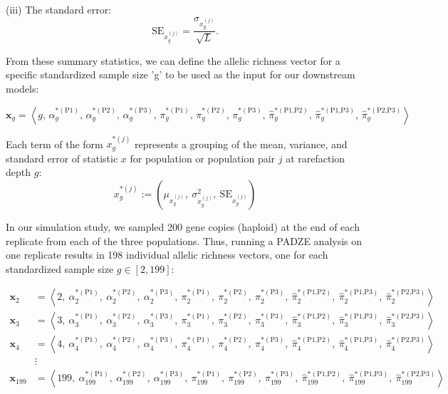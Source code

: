 \documentclass[11pt]{article}
\theoremstyle{plain}
\theoremstyle{definition}
\theoremstyle{remark}
\begin{document}
(iii) The standard error:
    \begin{equation}
    \text{SE}_{x^{(j)}_g} = \frac{\sigma_{x^{(j)}_g}}{\sqrt{L}}.
    \end{equation}


From these summary statistics, we can define the allelic richness vector for a specific standardized sample size 'g' to be used as the input for our downstream models:

\[
\mathbf{x}_g =
\left\langle
g,\,
\alpha^{*(\text{P1})}_g,\,
\alpha^{*(\text{P2})}_g,\,
\alpha^{*(\text{P3})}_g,\,
\pi^{*(\text{P1})}_g,\,
\pi^{*(\text{P2})}_g,\,
\pi^{*(\text{P3})}_g,\,
\hat{\pi}^{*(\text{P1,P2})}_g,\,
\hat{\pi}^{*(\text{P1,P3})}_g,\,
\hat{\pi}^{*(\text{P2,P3})}_g
\right\rangle
\]

\vspace{0.5em}

\noindent Each term of the form \( x^{*(j)}_g \) represents a grouping of the mean, variance, and standard error of statistic \( x \) for population or population pair \( j \) at rarefaction depth \( g \):
\[
x^{*(j)}_g := \left( \mu_{x^{(j)}_g},\ \sigma^2_{x^{(j)}_g},\ \mathrm{SE}_{x^{(j)}_g} \right)
\]

In our simulation study, we sampled 200 gene copies (haploid) at the end of each replicate from each of the three populations. Thus, running a PADZE analysis on one replicate results in 198 individual allelic richness vectors, one for each standardized sample size $g \in [2, 199]$:

\[
\begin{aligned}
\mathbf{x}_2 &= \left\langle 2,\ \alpha^{*(\text{P1})}_2,\ \alpha^{*(\text{P2})}_2,\ \alpha^{*(\text{P3})}_2,\ \pi^{*(\text{P1})}_2,\ \pi^{*(\text{P2})}_2,\ \pi^{*(\text{P3})}_2,\ \hat{\pi}^{*(\text{P1,P2})}_2,\ \hat{\pi}^{*(\text{P1,P3})}_2,\ \hat{\pi}^{*(\text{P2,P3})}_2 \right\rangle \\
\mathbf{x}_3 &= \left\langle 3,\ \alpha^{*(\text{P1})}_3,\ \alpha^{*(\text{P2})}_3,\ \alpha^{*(\text{P3})}_3,\ \pi^{*(\text{P1})}_3,\ \pi^{*(\text{P2})}_3,\ \pi^{*(\text{P3})}_3,\ \hat{\pi}^{*(\text{P1,P2})}_3,\ \hat{\pi}^{*(\text{P1,P3})}_3,\ \hat{\pi}^{*(\text{P2,P3})}_3 \right\rangle \\
\mathbf{x}_4 &= \left\langle 4,\ \alpha^{*(\text{P1})}_4,\ \alpha^{*(\text{P2})}_4,\ \alpha^{*(\text{P3})}_4,\ \pi^{*(\text{P1})}_4,\ \pi^{*(\text{P2})}_4,\ \pi^{*(\text{P3})}_4,\ \hat{\pi}^{*(\text{P1,P2})}_4,\ \hat{\pi}^{*(\text{P1,P3})}_4,\ \hat{\pi}^{*(\text{P2,P3})}_4 \right\rangle \\
&\vdots \\
\mathbf{x}_{199} &= \left\langle 199,\ \alpha^{*(\text{P1})}_{199},\ \alpha^{*(\text{P2})}_{199},\ \alpha^{*(\text{P3})}_{199},\ \pi^{*(\text{P1})}_{199},\ \pi^{*(\text{P2})}_{199},\ \pi^{*(\text{P3})}_{199},\ \hat{\pi}^{*(\text{P1,P2})}_{199},\ \hat{\pi}^{*(\text{P1,P3})}_{199},\ \hat{\pi}^{*(\text{P2,P3})}_{199} \right\rangle
\end{aligned}
\]
\end{document}
